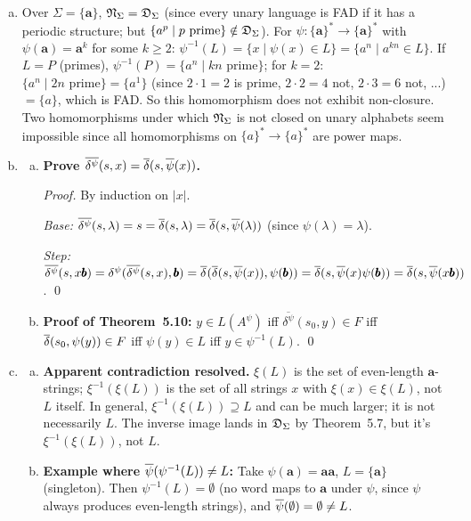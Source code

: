 \begin{enumerate}[{5.}1. ]
\begin{enumerate}[(a)]
\item Over $\Sigma=\{\pmb{a}\}$, $\mathfrak{N}_\Sigma=\mathfrak{D}_\Sigma$ (since every unary language is FAD if it has a periodic structure; but $\{a^{p}\mid p\text{ prime}\}\notin\mathfrak{D}_\Sigma$).  For $\psi:\{\pmb{a}\}^*\to\{\pmb{a}\}^*$ with $\psi(\pmb{a})=\pmb{a}^k$ for some $k\ge 2$: $\psi^{-1}(L)=\{x\mid\psi(x)\in L\}=\{a^n\mid a^{kn}\in L\}$.  If $L=P$ (primes), $\psi^{-1}(P)=\{a^n\mid kn\text{ prime}\}$; for $k=2$: $\{a^n\mid 2n\text{ prime}\}=\{a^1\}$ (since $2\cdot 1=2$ is prime, $2\cdot 2=4$ not, $2\cdot 3=6$ not, ...) $=\{a\}$, which is FAD.  So this homomorphism does not exhibit non-closure.  Two homomorphisms under which $\mathfrak{N}_\Sigma$ is not closed on unary alphabets seem impossible since all homomorphisms on $\{a\}^*\to\{a\}^*$ are power maps.

\item \begin{enumerate}[(a)]
  \item \textbf{Prove $\overline{\delta^\psi}(s,x)=\overline{\delta}(s,\overline{\psi}(x))$.}

  \begin{proof}
  By induction on $|x|$.

  \emph{Base:} $\overline{\delta^\psi}(s,\lambda)=s=\overline{\delta}(s,\lambda)=\overline{\delta}(s,\overline{\psi}(\lambda))$ (since $\psi(\lambda)=\lambda$).

  \emph{Step:} $\overline{\delta^\psi}(s,x\pmb{b})=\delta^\psi(\overline{\delta^\psi}(s,x),\pmb{b})=\overline{\delta^{}}(\overline{\delta}(s,\overline{\psi}(x)),\psi(\pmb{b}))=\overline{\delta}(s,\overline{\psi}(x)\psi(\pmb{b}))=\overline{\delta}(s,\overline{\psi}(x\pmb{b}))$. \qed
  \end{proof}

  \item \textbf{Proof of Theorem~5.10:} $y\in L(A^\psi)$ iff $\overline{\delta^\psi}(s_0,y)\in F$ iff $\overline{\delta}(s_0,\psi(y))\in F$ iff $\psi(y)\in L$ iff $y\in\psi^{-1}(L)$. \qed
\end{enumerate}

\item \begin{enumerate}[(a)]
  \item \textbf{Apparent contradiction resolved.}  $\xi(L)$ is the set of even-length $\pmb{a}$-strings; $\xi^{-1}(\xi(L))$ is the set of all strings $x$ with $\xi(x)\in\xi(L)$, not $L$ itself.  In general, $\xi^{-1}(\xi(L))\supseteq L$ and can be much larger; it is not necessarily $L$.  The inverse image lands in $\mathfrak{D}_\Sigma$ by Theorem~5.7, but it's $\xi^{-1}(\xi(L))$, not $L$.

  \item \textbf{Example where $\overline{\psi}(\psi^{-1}(L))\neq L$:} Take $\psi(\pmb{a})=\pmb{a}\pmb{a}$, $L=\{\pmb{a}\}$ (singleton).  Then $\psi^{-1}(L)=\emptyset$ (no word maps to $\pmb{a}$ under $\psi$, since $\psi$ always produces even-length strings), and $\overline{\psi}(\emptyset)=\emptyset\neq L$.


\end{enumerate}
\end{enumerate}
\end{enumerate}
